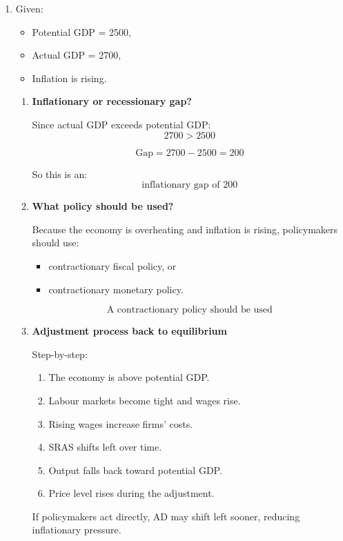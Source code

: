 \documentclass[12pt]{article}
\begin{document}
\begin{enumerate}[label=\textbf{\arabic*.}, start=17]

\item Given:
\begin{itemize}
    \item Potential GDP = 2500,
    \item Actual GDP = 2700,
    \item Inflation is rising.
\end{itemize}

\begin{enumerate}
    \item[(a)] \textbf{Inflationary or recessionary gap?}

Since actual GDP exceeds potential GDP:
\[
2700 > 2500
\]

\[
\text{Gap} = 2700 - 2500 = 200
\]

So this is an:
\[
\boxed{\text{inflationary gap of 200}}
\]

\item[(b)] \textbf{What policy should be used?}

Because the economy is overheating and inflation is rising, policymakers should use:
\begin{itemize}
    \item contractionary fiscal policy, or
    \item contractionary monetary policy.
\end{itemize}

\[
\boxed{\text{A contractionary policy should be used}}
\]

\item[(c)] \textbf{Adjustment process back to equilibrium}

Step-by-step:
\begin{enumerate}
    \item The economy is above potential GDP.
    \item Labour markets become tight and wages rise.
    \item Rising wages increase firms' costs.
    \item SRAS shifts left over time.
    \item Output falls back toward potential GDP.
    \item Price level rises during the adjustment.
\end{enumerate}

If policymakers act directly, AD may shift left sooner, reducing inflationary pressure.
\end{enumerate}

\end{enumerate}
\end{document}
